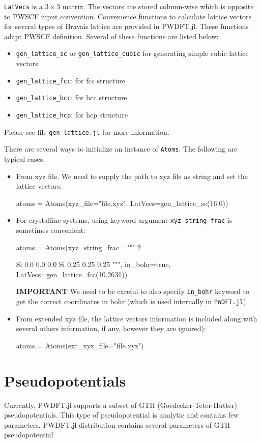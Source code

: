 \documentclass[a4paper,10pt]{article}
\newcommand{\jlinline}[1]{\texttt{#1}}
\newcommand{\txtinline}[1]{\texttt{#1}}
\begin{document}
\jlinline{LatVecs} is a $3\times3$ matrix. The vectors are stored column-wise which is
opposite to PWSCF input convention.
Convenience functions to calculate lattice vectors for several types of Bravais lattice
are provided in \textsf{PWDFT.jl}. These functions adapt PWSCF definition. Several
of these functions are listed below:
\begin{itemize}
\item \jlinline{gen_lattice_sc} or \jlinline{gen_lattice_cubic} for generating
simple cubic lattice vectors.
\item \jlinline{gen_lattice_fcc}: for fcc structure
\item \jlinline{gen_lattice_bcc}: for bcc structure
\item \jlinline{gen_lattice_hcp}: for hcp structure
\end{itemize}
Please see file \txtinline{gen_lattice.jl} for more information.


There are several ways to initialize an instance of \jlinline{Atoms}. The following
are typical cases.
%
\begin{itemize}
%
\item From xyz file. We need to supply the path to xyz file as string and
set the lattice vectors:
%
\begin{juliacode}
atoms = Atoms(xyz_file="file.xyz", LatVecs=gen_lattice_sc(16.0))
\end{juliacode}
%
\item For crystalline systems, using keyword argument \jlinline{xyz_string_frac}
is sometimes convenient:
%
\begin{juliacode}
atoms = Atoms(xyz_string_frac=
        """
        2

        Si  0.0  0.0  0.0
        Si  0.25  0.25  0.25
        """, in_bohr=true,
        LatVecs=gen_lattice_fcc(10.2631))
\end{juliacode}
%
\textbf{IMPORTANT} We need to be careful to also specify \jlinline{in_bohr} keyword to get
the correct coordinates in bohr (which is used internally in \jlinline{PWDFT.jl}).
%
\item From extended xyz file, the lattice vectors information is included
along with several others information, if any, however they are ignored):
%
\begin{juliacode}
atoms = Atoms(ext_xyz_file="file.xyz")
\end{juliacode}
%
\end{itemize}



\section{Pseudopotentials}
%
Currently, \textsf{PWDFT.jl} supports a subset of GTH (Goedecker-Teter-Hutter)
pseudopotentials. This type of pseudopotential is analytic and contains
few parameters.
%
\textsf{PWDFT.jl} distribution contains several parameters
of GTH pseudopotential
\end{document}
